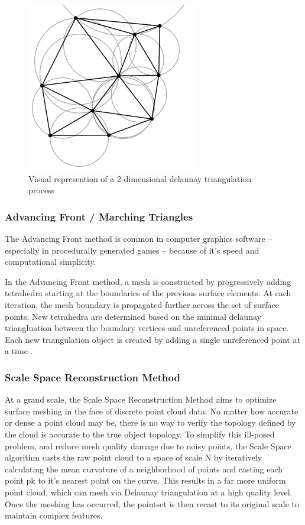 \documentclass[12pt]{drexelthesis}
\let\Oldsubsubsection\subsubsection
\renewcommand{\subsubsection}{\FloatBarrier\Oldsubsubsection}
\begin{document}
\begin{figure}[!ht]
\centering
\includegraphics{delaunay.png}
\caption[2D delaunay triangulation]{\centering Visual represention of a 2-dimensional delaunay triangulation process}
\end{figure}

\subsubsection{Advancing Front / Marching Triangles}
The Advancing Front method is common in computer graphics software – especially in procedurally generated games – because of it’s speed and computational simplicity.

In the Advancing Front method, a mesh is constructed by progressively adding tetrahedra starting at the boundaries of the previous surface elements. At each iteration, the mesh boundary is propagated further across the set of surface points. New tetrahedra are determined based on the minimal delaunay triangluation between the boundary vertices and unreferenced points in space. Each new triangulation object is created by adding a single unreferenced point at a time \cite{RN66}.

\subsubsection{Scale Space Reconstruction Method}
At a grand scale, the Scale Space Reconstruction Method aims to optimize surface meshing in the face of discrete point cloud data. No matter how accurate or dense a point cloud may be, there is no way to verify the topology defined by the cloud is accurate to the true object topology. To simplify this ill-posed problem, and reduce mesh quality damage due to noisy points, the Scale Space algorithm casts the raw point cloud to a space of scale N by iteratively calculating the mean curvature of a neighborhood of points and casting each point pk to it’s nearest point on the curve. This results in a far more uniform point cloud, which can mesh via Delaunay triangulation at a high quality level. Once the meshing has occurred, the pointset is then recast to its original scale to maintain complex features. 
\end{document}
